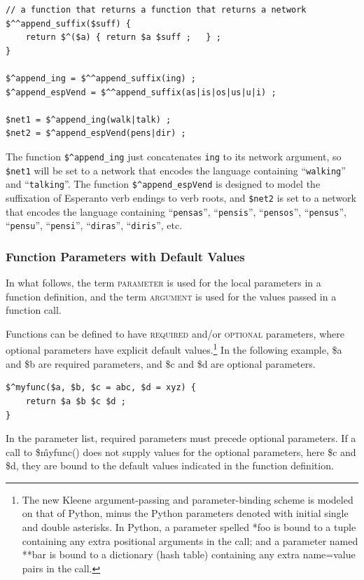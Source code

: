 \documentclass[letterpaper,12pt]{article}
\newcommand{\acro}{\textsc}
\newcommand{\str}[1]{``\texttt{#1}''}
\begin{document}
\begin{Verbatim}[fontsize=\small]
// a function that returns a function that returns a network
$^^append_suffix($suff) {
	return $^($a) { return $a $suff ;	} ;
}

$^append_ing = $^^append_suffix(ing) ;
$^append_espVend = $^^append_suffix(as|is|os|us|u|i) ;

$net1 = $^append_ing(walk|talk) ;
$net2 = $^append_espVend(pens|dir) ;
\end{Verbatim}

\noindent
The function \verb!$^append_ing! just concatenates \verb!ing! to
its network argument, so \verb!$net1! will be set to a network that
encodes the language containing \str{walking} and \str{talking}.
The function \verb!$^append_espVend! is designed to model the
suffixation of Esperanto verb endings to verb roots, and
\verb!$net2! is set to a network that encodes the language
containing \str{pensas}, \str{pensis}, \str{pensos},
\str{pensus}, \str{pensu}, \str{pensi}, \str{diras}, \str{diris}, etc.


\subsubsection{Function Parameters with Default Values}

In what follows, the term \acro{parameter} is used for the local
parameters in a function definition, and the term \acro{argument} is
used for the values passed in a function call.

Functions can be defined to have \acro{required} and/or \acro{optional}
parameters, where optional parameters have explicit default
values.\footnote{The new Kleene argument-passing and parameter-binding scheme
is modeled on that of Python, minus the Python parameters denoted with
initial single and double asterisks.  In Python, a parameter spelled
*foo is bound to a tuple containing any extra positional arguments in
the call; and
a parameter named **bar is bound to a dictionary (hash table) containing any
extra name=value pairs in the call.} In
the following example, \$a and \$b are required parameters, and \$c and
\$d are optional parameters.

\begin{Verbatim}[fontsize=\small]
$^myfunc($a, $b, $c = abc, $d = xyz) {
	return $a $b $c $d ;
}
\end{Verbatim}

\noindent
In the parameter list, required parameters must precede optional parameters.
If a call to \$\^myfunc() does not supply values for the optional
parameters, here \$c and \$d, they are bound to the default values indicated
in the function definition.
\end{document}
